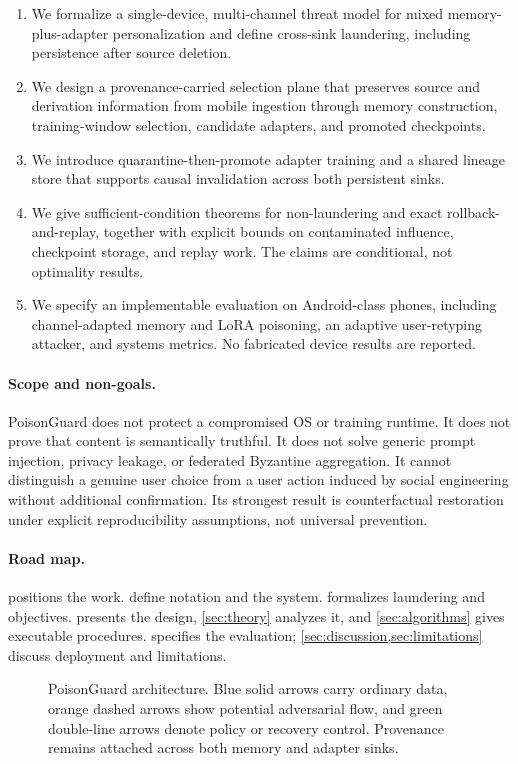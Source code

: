 \begin{enumerate}
  \item We formalize a single-device, multi-channel threat model for mixed memory-plus-adapter personalization and define cross-sink laundering, including persistence after source deletion.
  \item We design a provenance-carried selection plane that preserves source and derivation information from mobile ingestion through memory construction, training-window selection, candidate adapters, and promoted checkpoints.
  \item We introduce quarantine-then-promote adapter training and a shared lineage store that supports causal invalidation across both persistent sinks.
  \item We give sufficient-condition theorems for non-laundering and exact rollback-and-replay, together with explicit bounds on contaminated influence, checkpoint storage, and replay work. The claims are conditional, not optimality results.
  \item We specify an implementable evaluation on Android-class phones, including channel-adapted memory and LoRA poisoning, an adaptive user-retyping attacker, and systems metrics. No fabricated device results are reported.
\end{enumerate}

\paragraph{Scope and non-goals.} PoisonGuard does not protect a compromised OS or training runtime. It does not prove that content is semantically truthful. It does not solve generic prompt injection, privacy leakage, or federated Byzantine aggregation. It cannot distinguish a genuine user choice from a user action induced by social engineering without additional confirmation. Its strongest result is counterfactual restoration under explicit reproducibility assumptions, not universal prevention.

\paragraph{Road map.}  positions the work.  define notation and the system.  formalizes laundering and objectives.  presents the design, \cref{sec:theory} analyzes it, and \cref{sec:algorithms} gives executable procedures.  specifies the evaluation; \cref{sec:discussion,sec:limitations} discuss deployment and limitations.

\begin{figure}[t]
  \centering
  \resizebox{0.95\textwidth}{!}{}
  \caption{PoisonGuard architecture. Blue solid arrows carry ordinary data, orange dashed arrows show potential adversarial flow, and green double-line arrows denote policy or recovery control. Provenance remains attached across both memory and adapter sinks.}
  \label{fig:architecture}
\end{figure}
